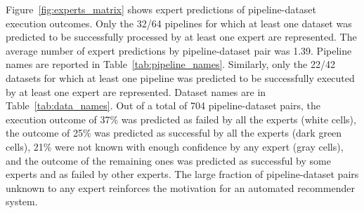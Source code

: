 Figure~\ref{fig:experts_matrix} shows expert predictions of
pipeline-dataset execution outcomes. Only the 32/64 pipelines for which at
least one dataset was predicted to be successfully processed by at least
one expert are represented. The average number of expert predictions by pipeline-dataset pair was 1.39. Pipeline names are reported in
Table~\ref{tab:pipeline_names}. Similarly, only the 22/42 datasets for which
at least one pipeline was predicted to be successfully executed by at least
one expert are represented. Dataset names are in Table~\ref{tab:data_names}. Out of a total of 704 pipeline-dataset pairs,
the execution outcome of 37\% was predicted as failed by all the experts
(white cells), the outcome of 25\% was predicted as successful by all the
experts (dark green cells), 21\% were not known with enough confidence by
any expert (gray cells), and the outcome of the remaining ones was
predicted as successful by some experts and as failed by other experts. The
large fraction of pipeline-dataset pairs unknown to any expert reinforces
the motivation for an automated recommender system.

